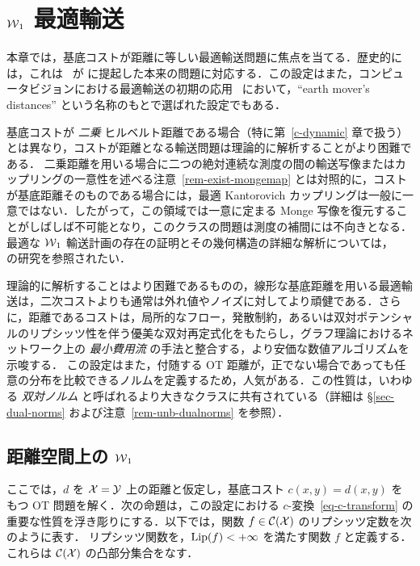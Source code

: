 

\chapter{$\operatorname{\mathcal{W}}_1$ 最適輸送}
\label{c-w1}

本章では，基底コストが距離に等しい最適輸送問題に焦点を当てる．歴史的には，これは~\citeauthor{Monge1781} が \citeyear{Monge1781} に提起した本来の問題に対応する．この設定はまた，コンピュータビジョンにおける最適輸送の初期の応用~\citep{RubTomGui00} において，``earth mover's distances'' という名称のもとで選ばれた設定でもある．

基底コストが \emph{二乗} ヒルベルト距離である場合（特に第~\ref{c-dynamic} 章で扱う）とは異なり，コストが距離となる輸送問題は理論的に解析することがより困難である．
%
二乗距離を用いる場合に二つの絶対連続な測度の間の輸送写像またはカップリングの一意性を述べる注意~\ref{rem-exist-mongemap} とは対照的に，コストが基底距離そのものである場合には，最適 Kantorovich カップリングは一般に一意ではない．したがって，この領域では一意に定まる Monge 写像を復元することがしばしば不可能となり，このクラスの問題は測度の補間には不向きとなる．
%
最適な $\operatorname{\mathcal{W}}_1$ 輸送計画の存在の証明とその幾何構造の詳細な解析については，~\citet{trudinger2001monge,caffarelli2002constructing,sudakov1979geometric,evans1999differential} の研究を参照されたい．

理論的に解析することはより困難であるものの，線形な基底距離を用いる最適輸送は，二次コストよりも通常は外れ値やノイズに対してより頑健である．さらに，距離であるコストは，局所的なフロー，発散制約，あるいは双対ポテンシャルのリプシッツ性を伴う優美な双対再定式化をもたらし，グラフ理論におけるネットワーク上の \emph{最小費用流} の手法と整合する，より安価な数値アルゴリズムを示唆する．
%
この設定はまた，付随する OT 距離が，正でない場合であっても任意の分布を比較できるノルムを定義するため，人気がある．この性質は，いわゆる \emph{双対ノルム} と呼ばれるより大きなクラスに共有されている（詳細は \S\ref{sec-dual-norms} および注意~\ref{rem-unb-dualnorms} を参照）．

\section{距離空間上の $\operatorname{\mathcal{W}}_1$}
\label{sec-w1-metric}

ここでは，$d$ を $\mathcal{X}=\mathcal{Y}$ 上の距離と仮定し，基底コスト $c(x,y)=d(x,y)$ をもつ OT 問題を解く．次の命題は，この設定における $c$-変換~\eqref{eq-c-transform} の重要な性質を浮き彫りにする．以下では，関数 $f \in \mathcal{C}(\mathcal{X})$ のリプシッツ定数を次のように表す．
リプシッツ関数を，$\operatorname{Lip}(f) < +\infty$ を満たす関数 $f$ と定義する．これらは $\mathcal{C}(\mathcal{X})$ の凸部分集合をなす．

